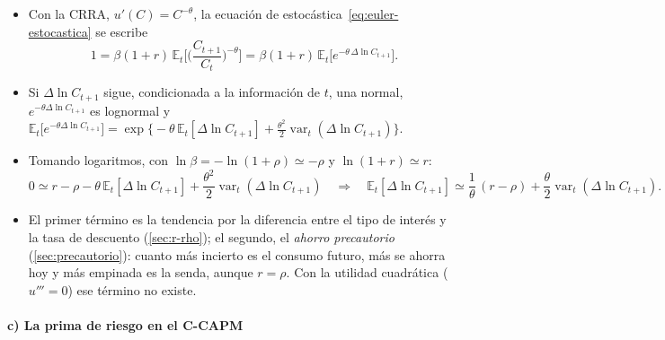 \documentclass[11pt]{article}
\begin{document}
\begin{itemize}
\item Con la CRRA, $u'(C)=C^{-\theta}$, la ecuación de  estocástica~\eqref{eq:euler-estocastica} se escribe
  \begin{equation*}
  1=\beta(1+r)\,\mathbb{E}_t\Big[\Big(\frac{C_{t+1}}{C_t}\Big)^{-\theta}\Big]=\beta(1+r)\,\mathbb{E}_t\big[e^{-\theta\,\Delta\ln C_{t+1}}\big].
  \end{equation*}
\item Si $\Delta\ln C_{t+1}$ sigue, condicionada a la información de $t$, una normal, $e^{-\theta\Delta\ln C_{t+1}}$ es lognormal y $\mathbb{E}_t\big[e^{-\theta\Delta\ln C_{t+1}}\big]=\exp\big\{-\theta\,\mathbb{E}_t[\Delta\ln C_{t+1}]+\tfrac{\theta^2}{2}\operatorname{var}_t(\Delta\ln C_{t+1})\big\}$.
\item Tomando logaritmos, con $\ln\beta=-\ln(1+\rho)\simeq-\rho$ y $\ln(1+r)\simeq r$:
  \begin{equation*}
  0\simeq r-\rho-\theta\,\mathbb{E}_t[\Delta\ln C_{t+1}]+\frac{\theta^2}{2}\operatorname{var}_t(\Delta\ln C_{t+1})\quad\Longrightarrow\quad\mathbb{E}_t[\Delta\ln C_{t+1}]\simeq\frac{1}{\theta}\,(r-\rho)+\frac{\theta}{2}\operatorname{var}_t(\Delta\ln C_{t+1}).
  \end{equation*}
\item El primer término es la tendencia por la diferencia entre el tipo de interés y la tasa de descuento (\ref{sec:r-rho}); el segundo, el \emph{ahorro precautorio} (\ref{sec:precautorio}): cuanto más incierto es el consumo futuro, más se ahorra hoy y más empinada es la senda, aunque $r=\rho$. Con la utilidad cuadrática ($u'''=0$) ese término no existe.\findemo
\end{itemize}

\paragraph{c) La prima de riesgo en el C-CAPM}
\end{document}
